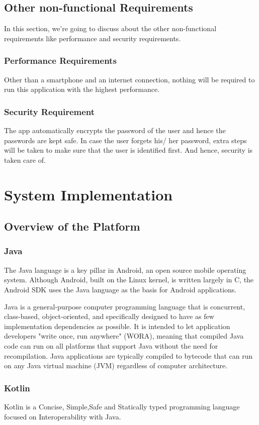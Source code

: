 \documentclass[BTech]{srmuthesis}
\begin{document}
\section{Other non-functional Requirements}
In this section, we're going to discuss about the other non-functional requirements like performance and security requirements. 
\subsection{Performance Requirements}
Other than a smartphone and an internet connection, nothing will be required to run this application with the highest performance.
\subsection{Security Requirement}
The app automatically encrypts the password of the user and hence the passwords are kept safe. In case the user forgets his/ her password, extra steps will be taken to make sure that the user is identified first. And hence, security is taken care of.
\chapter{System Implementation}
\section{Overview of the Platform}
\subsection{Java}
The Java language is a key pillar in Android, an open source mobile operating system. Although Android, built on the Linux kernel, is written largely in C, the Android SDK uses the Java language as the basis for Android applications.

Java is a general-purpose computer programming language that is concurrent, class-based, object-oriented, and specifically designed to have as few implementation dependencies as possible. It is intended to let application developers "write once, run anywhere" (WORA), meaning that compiled Java code can run on all platforms that support Java without the need for recompilation. Java applications are typically compiled to bytecode that can run on any Java virtual machine (JVM) regardless of computer architecture. 
\subsection{Kotlin}
Kotlin is a Concise, Simple,Safe and Statically typed programming language focused on Interoperability with Java. 
\end{document}
